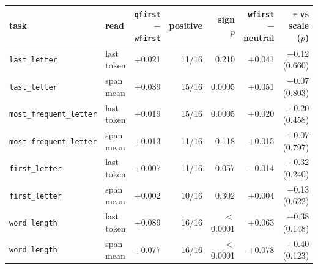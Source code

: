 \begin{tabular}{@{}llrrrrr@{}}
\toprule
task & read & \texttt{qfirst}$-$\texttt{wfirst} & positive & sign $p$ & \texttt{wfirst}$-$neutral & $r$ vs scale ($p$) \\
\midrule
\texttt{last\_letter} & last token & +0.021 & 11/16 & 0.210 & +0.041 & $-$0.12 (0.660) \\
\texttt{last\_letter} & span mean & +0.039 & 15/16 & 0.0005 & +0.051 & +0.07 (0.803) \\
\texttt{most\_frequent\_letter} & last token & +0.019 & 15/16 & 0.0005 & +0.020 & +0.20 (0.458) \\
\texttt{most\_frequent\_letter} & span mean & +0.013 & 11/16 & 0.118 & +0.015 & +0.07 (0.797) \\
\texttt{first\_letter} & last token & +0.007 & 11/16 & 0.057 & $-$0.014 & +0.32 (0.240) \\
\texttt{first\_letter} & span mean & +0.002 & 10/16 & 0.302 & +0.004 & +0.13 (0.622) \\
\texttt{word\_length} & last token & +0.089 & 16/16 & $<$0.0001 & +0.063 & +0.38 (0.148) \\
\texttt{word\_length} & span mean & +0.077 & 16/16 & $<$0.0001 & +0.078 & +0.40 (0.123) \\
\bottomrule
\end{tabular}